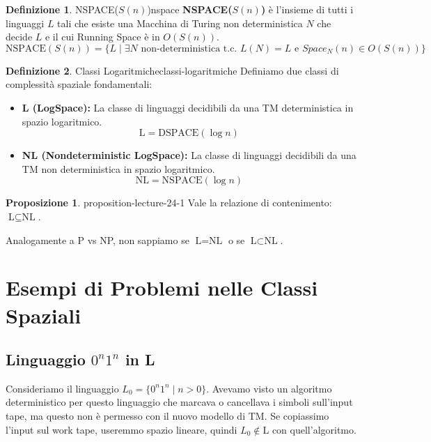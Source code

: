 \documentclass[a4paper]{article}
\theoremstyle{definition} %
\newtheorem{definition}{Definizione}[section]
\newtheorem{proposition}{Proposizione}[section]
\begin{document}
\begin{definition}{NSPACE($S(n)$)}{nspace}
\textbf{NSPACE($S(n)$)} è l'insieme di tutti i linguaggi $L$ tali che esiste una Macchina di Turing non deterministica $N$ che decide $L$ e il cui Running Space è in $O(S(n))$.
\[ \text{NSPACE}(S(n)) = \{ L \mid \exists N \text{ non-deterministica t.c. } L(N) = L \text{ e } Space_N(n) \in O(S(n)) \} \]
\end{definition}

\begin{definition}{Classi Logaritmiche}{classi-logaritmiche}
Definiamo due classi di complessità spaziale fondamentali:
\begin{itemize}
    \item \textbf{L (LogSpace):} La classe di linguaggi decidibili da una TM deterministica in spazio logaritmico.
    \[ \text{L} = \text{DSPACE}(\log n) \]
    \item \textbf{NL (Nondeterministic LogSpace):} La classe di linguaggi decidibili da una TM non deterministica in spazio logaritmico.
    \[ \text{NL} = \text{NSPACE}(\log n) \]
\end{itemize}
\end{definition}

\begin{proposition}{}{{ proposition-lecture-24-1 }}
Vale la relazione di contenimento: $\text{L} \subseteq \text{NL}$.
\end{proposition}
Analogamente a P vs NP, non sappiamo se $\text{L} = \text{NL}$ o se $\text{L} \subset \text{NL}$.

\section{Esempi di Problemi nelle Classi Spaziali}

\subsection{Linguaggio $0^n1^n$ in L}

Consideriamo il linguaggio $L_0 = \{0^n1^n \mid n > 0\}$.
Avevamo visto un algoritmo deterministico per questo linguaggio che marcava o cancellava i simboli sull'input tape, ma questo non è permesso con il nuovo modello di TM. Se copiassimo l'input sul work tape, useremmo spazio lineare, quindi $L_0 \notin \text{L}$ con quell'algoritmo.
\end{document}
